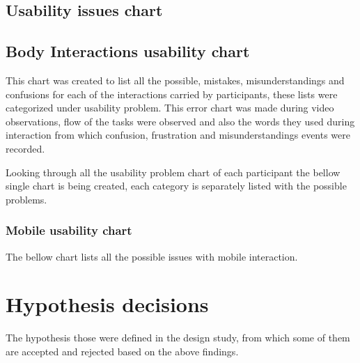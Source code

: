\subsection{Usability issues chart}


\subsection{Body Interactions usability chart}



This chart was created to list all the possible, mistakes, misunderstandings and confusions for each of the interactions carried by participants, these lists were categorized under usability problem. This error chart was made during video observations, flow of the tasks were observed and also the words they used during interaction from which confusion, frustration and misunderstandings events were recorded. 

Looking through all the usability problem chart of each participant the bellow single chart is being created, each category is separately listed with the possible problems.



\subsubsection{Mobile usability chart}
The bellow chart lists all the possible issues with mobile interaction.




\section{Hypothesis decisions}

The hypothesis those were defined in the design study, from which some of them are accepted and rejected based on the above findings. 

